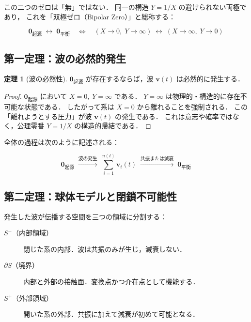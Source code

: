 \documentclass[12pt, a4paper]{article}
\theoremstyle{definition}
\newtheorem{theorem}{定理}
\newcommand{\vorigin}{\mathbf{0}_{\text{起源}}}
\newcommand{\vequil}{\mathbf{0}_{\text{平衡}}}
\begin{document}
この二つのゼロは「無」ではない．
同一の構造 $Y = 1/X$ の避けられない両極であり，
これを「双極ゼロ（Bipolar Zero）」と総称する：

\begin{equation}
  \vorigin \;\longleftrightarrow\; \vequil
  \quad \Longleftrightarrow \quad
  (X \to 0,\; Y \to \infty) \;\longleftrightarrow\; (X \to \infty,\; Y \to 0)
\end{equation}

\subsection{第一定理：波の必然的発生}

\begin{theorem}[波の必然性]
  $\vorigin$ が存在するならば，波 $\mathbf{v}(t)$ は必然的に発生する．
\end{theorem}

\begin{proof}
  $\vorigin$ において $X = 0,\; Y = \infty$ である．
  $Y = \infty$ は物理的・構造的に存在不可能な状態である．
  したがって系は $X = 0$ から離れることを強制される．
  この「離れようとする圧力」が波 $\mathbf{v}(t)$ の発生である．
  これは意志や確率ではなく，公理零番 $Y = 1/X$ の構造的帰結である．
\end{proof}

全体の過程は次のように記述される：

\begin{equation}
  \vorigin
  \;\xrightarrow{\text{波の発生}}\;
  \sum_{i=1}^{n(t)} \mathbf{v}_i(t)
  \;\xrightarrow{\text{共振または減衰}}\;
  \vequil
  \label{eq:main_process}
\end{equation}

\subsection{第二定理：球体モデルと閉鎖不可能性}

発生した波が伝播する空間を三つの領域に分割する：

\begin{description}
  \item[$S^-$（内部領域）] 閉じた系の内部．波は共振のみが生じ，減衰しない．
  \item[$\partial S$（境界）] 内部と外部の接触面．変換点かつ介在点として機能する．
  \item[$S^+$（外部領域）] 開いた系の外部．共振に加えて減衰が初めて可能となる．
\end{description}
\end{document}
